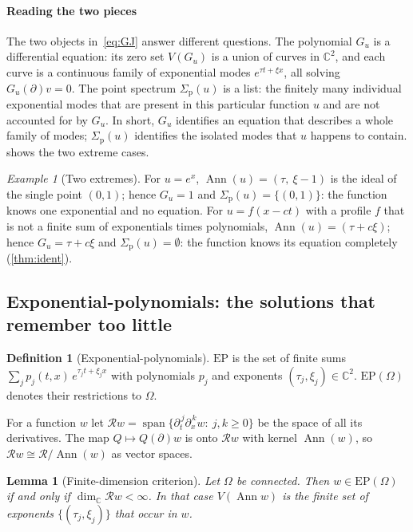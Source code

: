 \documentclass[11pt]{article}
\theoremstyle{plain}
\newtheorem{lemma}[theorem]{Lemma}
\theoremstyle{definition}
\newtheorem{definition}[theorem]{Definition}
\theoremstyle{remark}
\newtheorem{example}[theorem]{Example}
\newcommand{\C}{\mathbb{C}}
\newcommand{\ring}{\mathcal{R}}            %
\DeclareMathOperator{\Ann}{Ann}             %
\DeclareMathOperator{\spn}{span}
\newcommand{\Var}{V}                        %
\newcommand{\EP}{\mathrm{EP}}               %
\newcommand{\Gu}{G_u}                       %
\newcommand{\sigp}{\Sigma_{\mathrm p}}      %
\begin{document}
\paragraph{Reading the two pieces}
The two objects in~\eqref{eq:GJ} answer different questions. The polynomial $\Gu$ is a differential
equation: its zero set $\Var(\Gu)$ is a union of curves in $\C^2$, and each curve is a continuous family of
exponential modes $e^{\tau t+\xi x}$, all solving $\Gu(\partial)v=0$. The point spectrum $\sigp(u)$ is a list: the
finitely many individual exponential modes that are present in this particular function $u$ and are not
accounted for by $\Gu$. In short, $\Gu$ identifies an equation that describes a whole family of modes;
$\sigp(u)$ identifies the isolated modes that $u$ happens to contain.  shows the two
extreme cases.

\begin{example}[Two extremes]\label{ex:extremes}
For $u=e^{x}$, $\Ann(u)=(\tau,\ \xi-1)$ is the ideal of the single point $(0,1)$; hence $\Gu=1$ and
$\sigp(u)=\{(0,1)\}$: the function knows one exponential and no equation. For $u=f(x-ct)$ with a
profile $f$ that is not a finite sum of exponentials times polynomials,
$\Ann(u)=(\tau+c\xi)$; hence $\Gu=\tau+c\xi$ and $\sigp(u)=\emptyset$: the function knows its
equation completely (\cref{thm:ident}).
\end{example}



\subsection{Exponential-polynomials: the solutions that remember too little}\label{sec:ep}
\begin{definition}[Exponential-polynomials]\label{def:ep}
$\EP$ is the set of finite sums $\sum_{j}p_j(t,x)\,e^{\tau_jt+\xi_jx}$ with polynomials $p_j$ and
exponents $(\tau_j,\xi_j)\in\C^2$. $\EP(\Omega)$ denotes their restrictions to $\Omega$.
\end{definition}

For a function $w$ let $\ring w=\spn\{\partial_t^{\,j}\partial_x^{\,k}w:\ j,k\ge0\}$ be the space of all its
derivatives. The map $Q\mapsto Q(\partial)w$ is onto $\ring w$ with kernel $\Ann(w)$, so
$\ring w\cong\ring/\Ann(w)$ as vector spaces.

\begin{lemma}[Finite-dimension criterion]\label{lem:ep}
Let $\Omega$ be connected. Then $w\in\EP(\Omega)$ if and only if $\dim_\C\ring w<\infty$. In that case
$\Var(\Ann w)$ is the finite set of exponents $\{(\tau_j,\xi_j)\}$ that occur in $w$.
\end{lemma}
\end{document}
